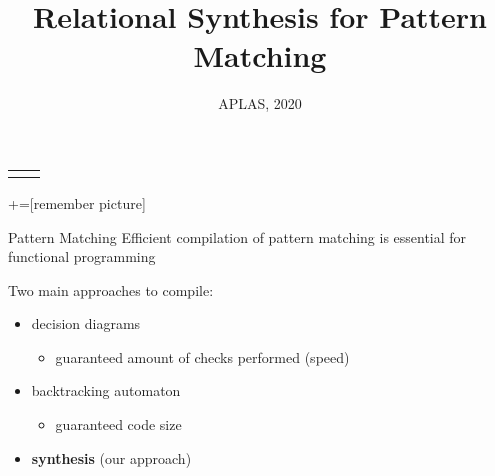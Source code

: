 \documentclass[aspectratio=169
  , xcolor={svgnames}
  , hyperref={ colorlinks,citecolor=Blue
             , linkcolor=DarkRed,urlcolor=DarkBlue}
  , russian
  ]{beamer}
\title{Relational Synthesis for Pattern Matching}
\date{APLAS, 2020}
\begin{document}
{
\begin{frame}[fragile]
  \begin{tabular}{p{5.5cm} p{5.5cm}}
   \begin{center}
    \end{center}
    &
    \begin{center}
    \end{center}
  \end{tabular}
  \titlepage
\end{frame}
}


+=[remember picture] 

\everymath{\displaystyle}
\begin{frame}{Pattern Matching}
Efficient compilation of pattern matching is essential for functional programming
\vspace{1cm}


Two main approaches to compile:
\begin{itemize}
\item decision diagrams
\begin{itemize}
\item guaranteed amount of checks performed (speed)
\end{itemize}
\item backtracking automaton
\begin{itemize}
\item guaranteed code size
\end{itemize}\pause
\item \textbf{synthesis} (our approach)
\end{itemize}

\end{frame}
\end{document}
